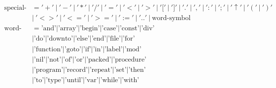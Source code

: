 \documentclass{article}
\begin{document}
\begin{align*}
\text{special-symbol} &= '+'\ |\ '-'\ |\ '*'\ |\ '/'\ |\ '='\ |\ '<'\ |\ '>'\ |\ '['\ |\ ']'\ |\ '.'\ |\ ','\ |\ ':'\ |\ ';'\ |\ '\uparrow'\ |\ '('\ |\ ')' \\
&|\ '<>'\ |\ '<='\ |\ '>='\ |\ ':='\ |\ '..'\ |\ \text{word-symbol} \\
\text{word-symbol} &= \text{'and'} | \text{'array'} | \text{'begin'} | \text{'case'} | \text{'const'} | \text{'div'} \\
&| \text{'do'} | \text{'downto'} | \text{'else'} | \text{'end'} | \text{'file'} | \text{'for'} \\
&| \text{'function'} | \text{'goto'} | \text{'if'} | \text{'in'} | \text{'label'} | \text{'mod'} \\
&| \text{'nil'} | \text{'not'} | \text{'of'} | \text{'or'} | \text{'packed'} | \text{'procedure'} \\
&| \text{'program'} | \text{'record'} | \text{'repeat'} | \text{'set'} | \text{'then'} \\
&| \text{'to'} | \text{'type'} | \text{'until'} | \text{'var'} | \text{'while'} | \text{'with'}
\end{align*}
\end{document}
